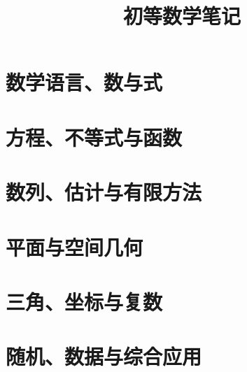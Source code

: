 \documentclass[UTF8,12pt,a4paper,fontset=fandol]{ctexbook}
\title{初等数学笔记}
\author{}
\date{}
\begin{document}
\frontmatter %

\maketitle
\tableofcontents


\mainmatter

\part{数学语言、数与式}





\part{方程、不等式与函数}





\part{数列、估计与有限方法}





\part{平面与空间几何}





\part{三角、坐标与复数}






\part{随机、数据与综合应用}




\appendix



\end{document}
